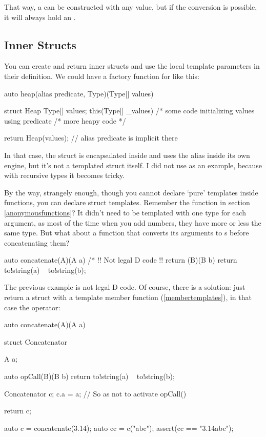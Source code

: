 That way, a  can be constructed with any value, but if the conversion is possible, it will always hold an .

\subsection{Inner Structs}\label{innerstructs}

You can create and return inner structs and use the local template parameters in their definition. We could have a factory function for  like this:

\begin{dcode}
auto heap(alias predicate, Type)(Type[] values)
{
    struct Heap
    {
        Type[] values;
        this(Type[] _values)
        {
            /* some code initializing values using predicate
        }
        /* more heapy code */
    }

    return Heap(values); // alias predicate is implicit there
}
\end{dcode}

In that case, the  struct is encapsulated inside  and uses the  alias inside its own engine, but it's not a templated struct itself. I did not use  as an example, because with recursive types it becomes tricky.

By the way, strangely enough, though you cannot declare `pure' templates inside functions, you can declare struct templates. Remember the  function in section \ref{anonymousfunctions}? It didn't need to be templated with one type for each argument, as most of the time when you add numbers, they have more or less the same type. But what about a function that converts its arguments to s before concatenating them?

\begin{dcode}
auto concatenate(A)(A a)
{
    /* !! Not legal D code !!
    return (B)(B b) { return to!string(a) ~ to!string(b);}
}
\end{dcode}

The previous example is not legal D code. Of course, there is a solution: just return a struct with a template member function (\ref{membertemplates}), in that case the  operator:

\begin{dcode}
auto concatenate(A)(A a)
{
    struct Concatenator 
    {
        A a;

        auto opCall(B)(B b)
        {
            return to!string(a) ~ to!string(b);
        }
    }

    Concatenator c;
    c.a = a; // So as not to activate opCall()

    return c;
}

auto c = concatenate(3.14);
auto cc = c("abc");
assert(cc == "3.14abc");
\end{dcode}

